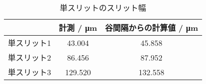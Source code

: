\begin{table}[!htp]\centering
	\caption{単スリットのスリット幅}\label{tab:ss_slit_width}
	\scriptsize
	\begin{tabular}{ccc}\toprule
		       & 計測 / \si{\micro\meter} & 谷間隔からの計算値 / \si{\micro\meter} \\\midrule
		単スリット1 & 43.004                 & 45.858                        \\
		単スリット2 & 86.456                 & 87.952                        \\
		単スリット3 & 129.520                & 132.558                       \\
		\bottomrule
	\end{tabular}
\end{table}
